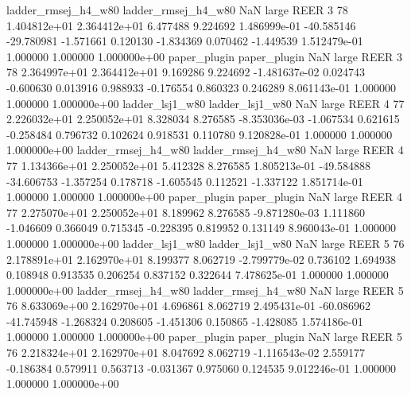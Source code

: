 ladder_rmsej_h4_w80 ladder_rmsej_h4_w80                   NaN      large     REER                 3 78 1.404812e+01   2.364412e+01      6.477488       9.224692  1.486999e-01    -40.585146    -29.780981    -1.571661       0.120130 -1.834369   0.070462    -1.449539   1.512479e-01            1.000000        1.000000        1.000000e+00
       paper_plugin        paper_plugin                   NaN      large     REER                 3 78 2.364997e+01   2.364412e+01      9.169286       9.224692 -1.481637e-02      0.024743     -0.600630     0.013916       0.988933 -0.176554   0.860323     0.246289   8.061143e-01            1.000000        1.000000        1.000000e+00
    ladder_lsj1_w80     ladder_lsj1_w80                   NaN      large     REER                 4 77 2.226032e+01   2.250052e+01      8.328034       8.276585 -8.353036e-03     -1.067534      0.621615    -0.258484       0.796732  0.102624   0.918531     0.110780   9.120828e-01            1.000000        1.000000        1.000000e+00
ladder_rmsej_h4_w80 ladder_rmsej_h4_w80                   NaN      large     REER                 4 77 1.134366e+01   2.250052e+01      5.412328       8.276585  1.805213e-01    -49.584888    -34.606753    -1.357254       0.178718 -1.605545   0.112521    -1.337122   1.851714e-01            1.000000        1.000000        1.000000e+00
       paper_plugin        paper_plugin                   NaN      large     REER                 4 77 2.275070e+01   2.250052e+01      8.189962       8.276585 -9.871280e-03      1.111860     -1.046609     0.366049       0.715345 -0.228395   0.819952     0.131149   8.960043e-01            1.000000        1.000000        1.000000e+00
    ladder_lsj1_w80     ladder_lsj1_w80                   NaN      large     REER                 5 76 2.178891e+01   2.162970e+01      8.199377       8.062719 -2.799779e-02      0.736102      1.694938     0.108948       0.913535  0.206254   0.837152     0.322644   7.478625e-01            1.000000        1.000000        1.000000e+00
ladder_rmsej_h4_w80 ladder_rmsej_h4_w80                   NaN      large     REER                 5 76 8.633069e+00   2.162970e+01      4.696861       8.062719  2.495431e-01    -60.086962    -41.745948    -1.268324       0.208605 -1.451306   0.150865    -1.428085   1.574186e-01            1.000000        1.000000        1.000000e+00
       paper_plugin        paper_plugin                   NaN      large     REER                 5 76 2.218324e+01   2.162970e+01      8.047692       8.062719 -1.116543e-02      2.559177     -0.186384     0.579911       0.563713 -0.031367   0.975060     0.124535   9.012246e-01            1.000000        1.000000        1.000000e+00
